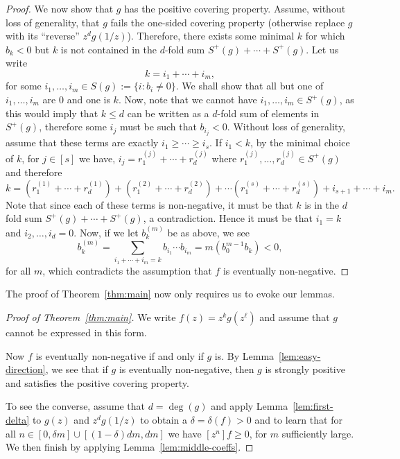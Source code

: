 \documentclass{daj}
\theoremstyle{definition}
\theoremstyle{remark}
\begin{document}
\begin{proof}
We now show that $g$ has the positive covering property. Assume, without loss of generality, that $g$ fails the one-sided covering property (otherwise replace $g$ with its ``reverse'' $z^dg(1/z)$). Therefore, there exists some minimal $k$ for which $b_k < 0 $ but $k$ is not contained in the $d$-fold sum $S^+(g) + \cdots + S^+(g)$.  Let us write  
\[ k = i_1 + \cdots + i_m ,\]
for some $i_1,\ldots,i_m \in S(g) := \{ i : b_i\not= 0 \}$. We shall show that all but one of $i_1,\ldots, i_m$ are $0$ and one is $k$.
Now, note that we cannot have $i_1,\ldots,i_m \in S^+(g)$, as this would imply that $k \leq d$ can be written as a $d$-fold sum of elements in $S^+(g)$, therefore some $i_j$ must be such that 
$b_{i_j} < 0$. 
Without loss of generality, assume that these terms are exactly $i_1 \geq \cdots \geq i_s$. If $i_1 < k$, by the minimal choice of $k$, for $j \in [s]$ we have, $i_j = r_1^{(j)} +\cdots + r^{(j)}_d$ where $r^{(j)}_1,\ldots,r^{(j)}_d \in S^+(g)$ and therefore 
\[ k = (r^{(1)}_1 + \cdots + r^{(1)}_d) + (r^{(2)}_1 + \cdots + r^{(2)}_d) + \cdots (r^{(s)}_1 + \cdots + r^{(s)}_d)+ i_{s+1} + \cdots +  i_m.\] Note that since each of these terms is non-negative, it must be that $k$ is in the $d$ fold sum 
$S^+(g) + \cdots + S^+(g)$, a contradiction. Hence it must be that $i_1 = k$ and $i_2,\ldots, i_d = 0$. 
Now, if we let $b^{(m)}_k$ be as above, we see
\[ b^{(m)}_k = \sum_{i_1 + \cdots + i_m = k} b_{i_1} \cdots b_{i_m} = m (b_0^{m-1}b_k) < 0, \]
for all $m$, which contradicts the assumption that $f$ is eventually non-negative.
\end{proof}


\vspace{4mm}


The proof of Theorem~\ref{thm:main} now only requires us to evoke our lemmas.

\begin{proof}[Proof of Theorem~\ref{thm:main}] 
	We write $f(z) = z^kg(z^{\ell})$ and assume that $g$ cannot be expressed in this form. 
	
	Now $f$ is eventually non-negative if and only if $g$ is. By Lemma~\ref{lem:easy-direction}, we see that if $g$ is eventually non-negative, then $g$ is strongly positive and satisfies the positive covering property.
	
	To see the converse, assume that $d = \deg(g)$ and apply Lemma~\ref{lem:first-delta} to  $g(z)$ and $z^dg(1/z)$
	to obtain a $\delta = \delta(f)>0$ and to learn that for all 
	$n \in [0,\delta m] \cup [(1-\delta)dm,dm]$ we have $[z^n]f \geq 0$, for $m$ sufficiently large. We then finish by applying Lemma~\ref{lem:middle-coeffs}.
\end{proof}
\end{document}
